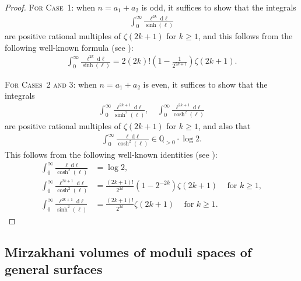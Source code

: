 \documentclass{amsart}
\newcommand{\QQ}{\mathbb{Q}}
\theoremstyle{definition}
\begin{document}
\begin{proof}
\textsc{For Case~1:} when $n=a_1+a_2$ is odd, it suffices to show that the integrals 
\begin{align}
\int_0^\infty
\frac{\ell^{2k}\;\mathrm{d}\ell}
{\sinh(\ell)}
\end{align} 
are positive rational multiples of $\zeta(2k+1)$ for $k\geqslant 1$, and this follows from the following well-known formula (see \cite[Equation~3.523(1)]{MR2360010}):
\begin{align}
\label{eq:int-even-power-over-sinh}
\int_0^\infty
\frac{\ell^{2k}\;\mathrm{d}\ell}{\sinh(\ell)}
= 2(2k)!\left(1-\frac{1}{2^{2k+1}}\right)\zeta(2k+1). 
\end{align}

\textsc{For Cases~2 and 3:} when $n=a_1+a_2$ is even, it suffices to show that the integrals
\begin{align}
\int_0^\infty
\frac{\ell^{2k+1}\;\mathrm{d}\ell}{\sinh^2(\ell)}
,\quad 
\int_0^\infty\frac{\ell^{2k+1}\;\mathrm{d}\ell}{\cosh^2(\ell)}
\end{align}
are positive rational multiples of $\zeta(2k+1)$ for $k \geqslant 1$, and also that
\begin{align*}
\int_0^\infty
\frac{\ell\;\mathrm{d}\ell}{\cosh^2(\ell)}
\in\QQ_{>0}\cdot\log2.    
\end{align*}
This follows from the following well-known identities (see \cite[Equation~3.527(4),(3),(1)]{MR2360010}):
\begin{align*}
\int_0^\infty
\frac{\ell\;\mathrm{d}\ell}{\cosh^2(\ell)}
&= \log2,
\\
\int_0^\infty
\frac{\ell^{2k+1}\;\mathrm{d}\ell}{\cosh^2(\ell)}
&= \frac{(2k+1)!}{2^{2k}}(1-2^{-2k})\zeta(2k+1)
\,\quad \text{for }k\geqslant1,
\\
\int_0^\infty
\frac{\ell^{2k+1}\;\mathrm{d}\ell}{\sinh^2(\ell)} 
 &= \frac{(2k+1)!}{2^{2k}}\zeta(2k+1) 
\,\quad \text{for }k\geqslant1.
\end{align*}
\end{proof}


\subsection{Mirzakhani volumes of moduli spaces of general surfaces}
\end{document}
